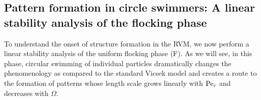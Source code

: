 \documentclass[aps,twocolumn,showlabels,showrefs,amsmath,amssymb,pre,superscriptaddress, floatfix, colors]{revtex4}
\newcommand{\1}{\begin{equation}}
\newcommand{\2}{\end{equation}}
\newcommand{\4}[2]{{\frac{#1}{#2}}}
\begin{document}
\subsection{Pattern formation in circle swimmers: A linear stability analysis of the flocking phase}
To understand the onset of structure formation in the RVM, we now perform a linear stability analysis of the uniform flocking phase (F).
As we will see, in this phase, circular swimming of individual particles dramatically changes the phenomenology as compared to the standard Vicsek model and
creates a route to the formation of patterns whose length scale grows linearly with ${\rm Pe}_r$ and decreases with $\Omega$.
\end{document}
